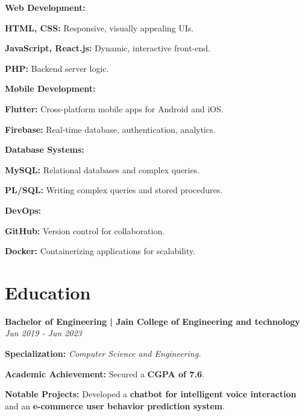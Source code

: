 \documentclass[a4paper,11pt]{article}
\begin{document}
\textbf{Web Development:} 
\begin{compactitem}
    \item \textbf{HTML, CSS:} Responsive, visually appealing UIs.
    \item \textbf{JavaScript, React.js:} Dynamic, interactive front-end.
    \item \textbf{PHP:} Backend server logic.
\end{compactitem}

\textbf{Mobile Development:} 
\begin{compactitem}
    \item \textbf{Flutter:} Cross-platform mobile apps for Android and iOS.
    \item \textbf{Firebase:} Real-time database, authentication, analytics.
\end{compactitem}

\textbf{Database Systems:} 
\begin{compactitem}
    \item \textbf{MySQL:} Relational databases and complex queries.
    \item \textbf{PL/SQL:} Writing complex queries and stored procedures.
\end{compactitem}

\textbf{DevOps:} 
\begin{compactitem}
    \item \textbf{GitHub:} Version control for collaboration.
    \item \textbf{Docker:} Containerizing applications for scalability.
\end{compactitem}

\section*{Education}

\textbf{Bachelor of Engineering | Jain College of Engineering and technology} \hfill \textit{Jun 2019 - Jun 2023} \\
\begin{compactitem}
    \item \textbf{Specialization:} \textit{Computer Science and Engineering.}
    \item \textbf{Academic Achievement:} Secured a \textbf{CGPA of 7.6}.
    \item \textbf{Notable Projects:} Developed a \textbf{chatbot for intelligent voice interaction} and an \textbf{e-commerce user behavior prediction system}.
\end{compactitem}
\end{document}
